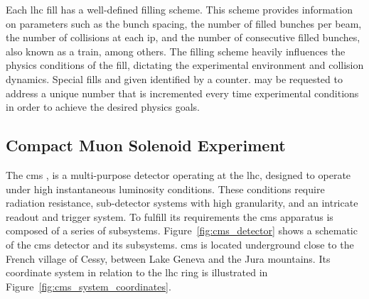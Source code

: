 Each \acrshort{lhc} fill has a well-defined filling scheme. This scheme provides information on parameters such as the bunch spacing, the number of filled bunches per beam, the number of collisions at each \acrshort{ip}, and the number of consecutive filled bunches, also known as a train, among others. The filling scheme heavily influences the physics conditions of the fill, dictating the experimental environment and collision dynamics. Special fills and given identified by a counter. may be requested to address a unique number that is incremented every time  experimental conditions in order to achieve the desired physics goals.


\subsection{Compact Muon Solenoid Experiment}
\label{subsec:cms}

The \acrlong{cms} \cite{TheCMSCollaboration_2008}, is a multi-purpose detector operating at the \acrshort{lhc}, designed to operate under high instantaneous luminosity conditions. These conditions require radiation resistance, sub-detector systems with high granularity, and an intricate readout and trigger system. To fulfill its requirements the \acrshort{cms} apparatus is composed of a series of subsystems. Figure~\ref{fig:cms_detector} shows a schematic of the \acrshort{cms} detector and its subsystems. \acrshort{cms} is located underground close to the French village of Cessy, between Lake Geneva and the Jura mountains. Its coordinate system in relation to the \acrshort{lhc} ring is illustrated in Figure~\ref{fig:cms_system_coordinates}.

